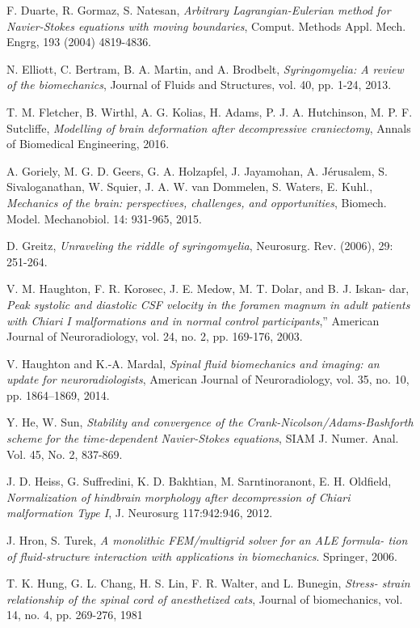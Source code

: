 \documentclass[a4paper,11pt,openright,twoside]{book}
\begin{document}
\begin{thebibliography}{100}
 F. Duarte, R. Gormaz, S. Natesan, \emph{Arbitrary Lagrangian-Eulerian method for Navier-Stokes equations with moving boundaries}, Comput. Methods Appl. Mech. Engrg, 193 (2004) 4819-4836.

 N. Elliott, C. Bertram, B. A. Martin, and A. Brodbelt, \emph{Syringomyelia: A review of the biomechanics}, Journal of Fluids and Structures, vol. 40, pp. 1-24, 2013.


 T. M. Fletcher, B. Wirthl, A. G. Kolias, H. Adams, P. J. A. Hutchinson, M. P. F. Sutcliffe, \emph{Modelling of brain deformation after decompressive craniectomy}, Annals of Biomedical Engineering, 2016.

 A. Goriely, M. G. D. Geers, G. A. Holzapfel, J. Jayamohan, A. Jérusalem, S. Sivaloganathan, W. Squier, J. A. W. van Dommelen, S. Waters, E. Kuhl., \emph{Mechanics of the brain: perspectives, challenges, and opportunities}, Biomech. Model. Mechanobiol. 14: 931-965, 2015.


 D. Greitz, \emph{Unraveling the riddle of syringomyelia}, Neurosurg. Rev. (2006), 29: 251-264.

 V. M. Haughton, F. R. Korosec, J. E. Medow, M. T. Dolar, and B. J. Iskan- dar, \emph{Peak systolic and diastolic CSF velocity in the foramen magnum in adult patients with Chiari I malformations and in normal control participants},” American Journal of Neuroradiology, vol. 24, no. 2, pp. 169-176, 2003.

 V. Haughton and K.-A. Mardal, \emph{Spinal fluid biomechanics and imaging: an update for neuroradiologists}, American Journal of Neuroradiology, vol. 35, no. 10, pp. 1864–1869, 2014.


 Y. He, W. Sun, \emph{Stability and convergence of the Crank-Nicolson/Adams-Bashforth scheme for the time-dependent Navier-Stokes equations}, SIAM J. Numer. Anal. Vol. 45, No. 2, 837-869.

 J. D. Heiss, G. Suffredini, K. D. Bakhtian, M. Sarntinoranont, E. H. Oldfield, \emph{Normalization of hindbrain morphology after decompression of Chiari malformation Type I}, J. Neurosurg 117:942:946, 2012.


 J. Hron, S. Turek, \emph{A monolithic FEM/multigrid solver for an ALE formula- tion of fluid-structure interaction with applications in biomechanics}. Springer, 2006.

 T. K. Hung, G. L. Chang, H. S. Lin, F. R. Walter, and L. Bunegin, \emph{Stress- strain relationship of the spinal cord of anesthetized cats}, Journal of biomechanics, vol. 14, no. 4, pp. 269-276, 1981


\end{thebibliography}
\end{document}
